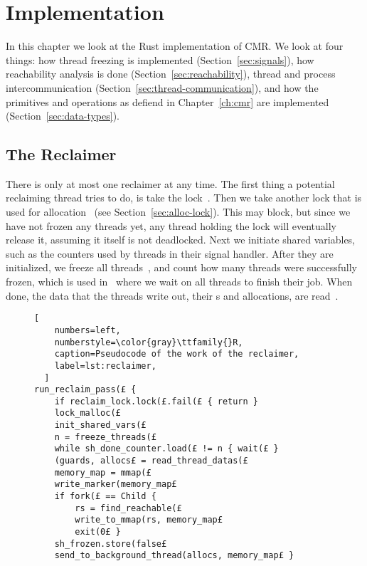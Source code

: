 \chapter{Implementation}

In this chapter we look at the Rust implementation of CMR\@.  We look at four things: how thread
freezing is implemented (Section~\ref{sec:signals}), how reachability analysis is done
(Section~\ref{sec:reachability}), thread and process intercommunication
(Section~\ref{sec:thread-communication}), and how the primitives and operations as defiend in
Chapter~\ref{ch:cmr} are implemented (Section~\ref{sec:data-types}).


\section{The Reclaimer\label{sec:thread-communication}}

There is only at most one reclaimer at any time. The first thing a potential reclaiming thread
tries to do, is take the lock~. Then we take another lock that is used for
allocation~ (see Section~\ref{sec:alloc-lock}). This may block, but since we have not
frozen any threads yet, any thread holding the lock will eventually release it, assuming it itself
is not deadlocked. Next we initiate shared variables, such as the counters used by threads in their
signal handler. After they are initialized, we freeze all threads~, and count how many
threads were successfully frozen, which is used in~ where we wait on all threads to
finish their job. When done, the data that the threads write out, their s and
allocations, are read~.

\begin{figure}[ht]
  \begin{lstlisting}[
    numbers=left,
    numberstyle=\color{gray}\ttfamily{}R,
    caption=Pseudocode of the work of the reclaimer,
    label=lst:reclaimer,
  ]
run_reclaim_pass(£ {
    if reclaim_lock.lock(£.fail(£ { return }
    lock_malloc(£
    init_shared_vars(£
    n = freeze_threads(£
    while sh_done_counter.load(£ != n { wait(£ }
    (guards, allocs£ = read_thread_datas(£
    memory_map = mmap(£
    write_marker(memory_map£
    if fork(£ == Child {
        rs = find_reachable(£
        write_to_mmap(rs, memory_map£
        exit(0£ }
    sh_frozen.store(false£
    send_to_background_thread(allocs, memory_map£ }\end{lstlisting}
\end{figure}

